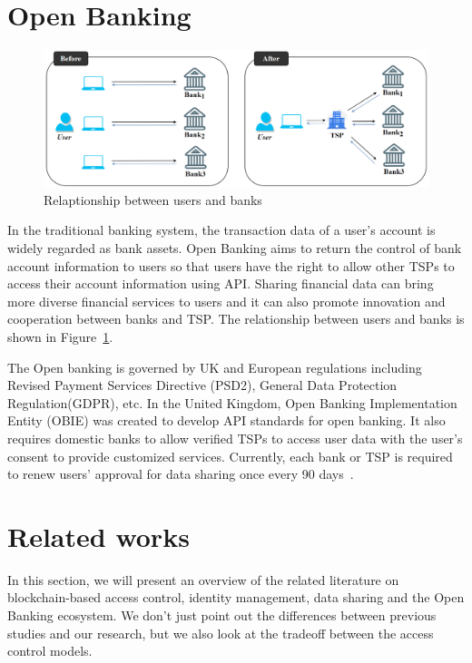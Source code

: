 \newpage

\section{Open Banking}
\begin{figure}[htb]
    \centering
    \includegraphics[height=!,width=1\linewidth,keepaspectratio=true]{figures/tsp_flow.png}
    \caption{{\footnotesize Relaptionship between users and banks}}
    \label{fig:tsp_flow}
\end{figure}
In the traditional banking system, the transaction data of a user's account is widely regarded as bank assets. Open Banking aims to return the control of bank account information to users so that users have the right to allow other TSPs to access their account information using API. Sharing financial data can bring more diverse financial services to users and it can also promote innovation and cooperation between banks and TSP. The relationship between users and banks is shown in Figure~\ref{fig:tsp_flow}.
\par
The Open banking is governed by UK and European regulations including Revised Payment Services Directive (PSD2), General Data Protection Regulation(GDPR), etc. In the United Kingdom, Open Banking Implementation Entity (OBIE) was created to develop API standards for open banking. It also requires domestic banks to allow verified TSPs to access user data with the user’s consent to provide customized services. Currently, each bank or TSP is required to renew users' approval for data sharing once every 90 days~\cite{morton}. 

\newpage

\section{Related works}
In this section, we will present an overview of the related literature on blockchain-based access control, identity management, data sharing and the Open Banking ecosystem. We don't just point out the differences between previous studies and our research, but we also look at the tradeoff between the access control models.
